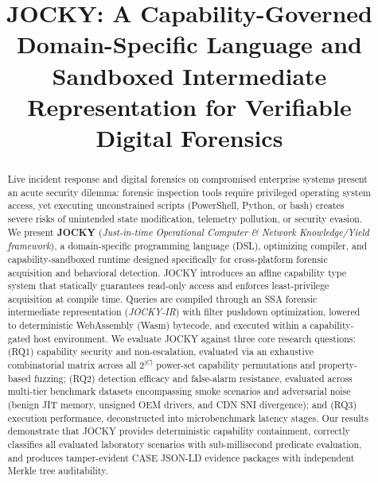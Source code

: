 \documentclass[10pt,conference]{IEEEtran}
\begin{document}
\title{JOCKY: A Capability-Governed Domain-Specific Language and Sandboxed Intermediate Representation for Verifiable Digital Forensics}

\author{
}

\maketitle

\begin{abstract}
Live incident response and digital forensics on compromised enterprise systems present an acute security dilemma: forensic inspection tools require privileged operating system access, yet executing unconstrained scripts (PowerShell, Python, or bash) creates severe risks of unintended state modification, telemetry pollution, or security evasion. We present \textbf{JOCKY} (\textit{Just-in-time Operational Computer \& Network Knowledge/Yield framework}), a domain-specific programming language (DSL), optimizing compiler, and capability-sandboxed runtime designed specifically for cross-platform forensic acquisition and behavioral detection. JOCKY introduces an affine capability type system that statically guarantees read-only access and enforces least-privilege acquisition at compile time. Queries are compiled through an SSA forensic intermediate representation (\textit{JOCKY-IR}) with filter pushdown optimization, lowered to deterministic WebAssembly (Wasm) bytecode, and executed within a capability-gated host environment. We evaluate JOCKY against three core research questions: (RQ1) capability security and non-escalation, evaluated via an exhaustive combinatorial matrix across all $2^{|C|}$ power-set capability permutations and property-based fuzzing; (RQ2) detection efficacy and false-alarm resistance, evaluated across multi-tier benchmark datasets encompassing smoke scenarios and adversarial noise (benign JIT memory, unsigned OEM drivers, and CDN SNI divergence); and (RQ3) execution performance, deconstructed into microbenchmark latency stages. Our results demonstrate that JOCKY provides deterministic capability containment, correctly classifies all evaluated laboratory scenarios with sub-millisecond predicate evaluation, and produces tamper-evident CASE JSON-LD evidence packages with independent Merkle tree auditability.
\end{abstract}
\end{document}
